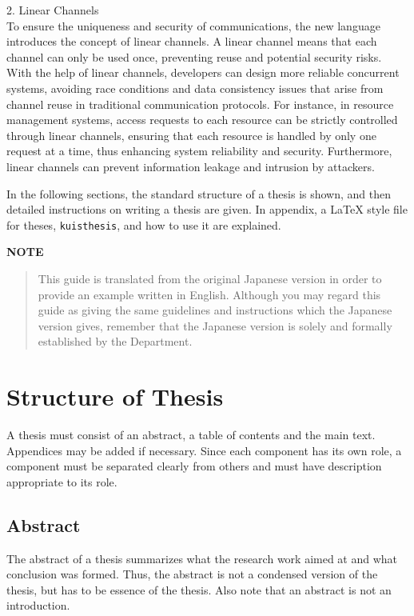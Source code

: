 \documentclass[master,english]{kuisthesis}
\begin{document}
2. Linear Channels\\
To ensure the uniqueness and security of communications, the new language introduces the concept of linear channels. A linear channel means that each channel can only be used once, preventing reuse and potential security risks. With the help of linear channels, developers can design more reliable concurrent systems, avoiding race conditions and data consistency issues that arise from channel reuse in traditional communication protocols. For instance, in resource management systems, access requests to each resource can be strictly controlled through linear channels, ensuring that each resource is handled by only one request at a time, thus enhancing system reliability and security. Furthermore, linear channels can prevent information leakage and intrusion by attackers.


In the following sections, the standard structure of a thesis is shown, and
then detailed instructions on writing a thesis are given.  In appendix, a
\LaTeX{} style file for theses, \verb|kuisthesis|, and how to use it are
explained.

\par\bigskip\centerline{\bf NOTE}
\begin{quote}
  This guide is translated from the original Japanese version in order
  to provide an example written in English.  Although you may regard
  this guide as giving the same guidelines and instructions which the
  Japanese version gives, remember that the Japanese version is solely
  and formally established by the Department.
\end{quote}

\section{Structure of Thesis}\label{sec-structure}
A thesis must consist of an abstract, a table of contents and the main text.
Appendices may be added if necessary.  Since each component has its own role,
a component must be separated clearly from others and must have description
appropriate to its role.

\subsection{Abstract}\label{subsec-abstract}
The abstract of a thesis summarizes what the research work aimed at and what
conclusion was formed.  Thus, the abstract is not a condensed version of the
thesis, but has to be essence of the thesis.  Also note that an abstract
is not an introduction.
\end{document}
